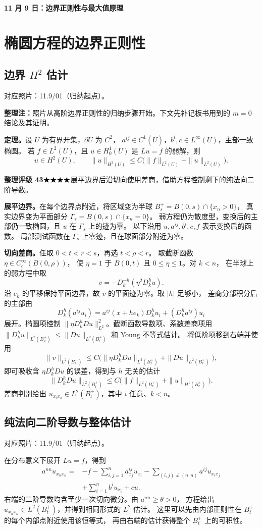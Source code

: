 \documentclass[UTF8,a4paper,11pt,fontset=fandol]{ctexart}
\newcommand{\Ub}{\overline U}
\newcommand{\ednote}[1]{\par{\small\color{notegray}\textbf{整理注：}#1}\par}
\newcommand{\source}[1]{{\small\color{notegray}对应照片：#1。}\par}
\newcommand{\proofstars}[1]{\ensuremath{%
\ifnum#1>0\relax\bigstar\fi
\ifnum#1>1\relax\bigstar\fi
\ifnum#1>2\relax\bigstar\fi
\ifnum#1>3\relax\bigstar\fi
\ifnum#1>4\relax\bigstar\fi}}
\newcommand{\proofrating}[3]{\par{\small\color{proofblue}%
\textbf{整理评级 #1}\enspace\proofstars{#2}\quad #3\par}}
\begin{document}
\newpage
{}
\begin{center}
  {\Large\bfseries 11 月 9 日：边界正则性与最大值原理}
\end{center}
\section{椭圆方程的边界正则性}
\subsection{\texorpdfstring{边界 $H^2$ 估计}{边界二阶估计}}
\source{11.9/01（归纳起点）}
\ednote{照片从高阶边界正则性的归纳步骤开始。下文先补记板书用到的 $m=0$ 结论及其证明。}
\textbf{定理。}设 $U$ 为有界开集，$\partial U$ 为 $C^2$，
$a^{ij}\in C^1(\Ub)$，$b^i,c\in L^\infty(U)$，主部一致椭圆。
若 $f\in L^2(U)$，且 $u\in H_0^1(U)$ 是 $Lu=f$ 的弱解，则
\[
\boxed{u\in H^2(U),\qquad
\|u\|_{H^2(U)}\le C\bigl(\|f\|_{L^2(U)}+\|u\|_{L^2(U)}\bigr).}
\]

\proofrating{43}{4}{展平边界后沿切向使用差商，借助方程控制剩下的纯法向二阶导数。}
\textbf{展平边界。}在每个边界点附近，将区域变为半球 $B_s^+=B(0,s)\cap\{x_n>0\}$，
真实边界变为平面部分 $\Gamma_s=B(0,s)\cap\{x_n=0\}$。
弱方程仍为散度型，变换后的主部仍一致椭圆，且 $u$ 在 $\Gamma_s$ 上的迹为零。
以下沿用 $u,a^{ij},b^i,c,f$ 表示变换后的函数。
局部测试函数在 $\Gamma_s$ 上零迹，且在球面部分附近为零。

\textbf{切向差商。}任取 $0<t<r<s$，再选 $t<\rho<r$。
取截断函数 $\eta\in C_c^\infty(B(0,\rho))$，
使 $\eta=1$ 于 $B(0,t)$ 且 $0\le\eta\le1$。对 $k<n$，
在半球上的弱方程中取
\[
v=-D_k^{-h}(\eta^2D_k^hu).
\]
沿 $e_k$ 的平移保持平面边界，故 $v$ 的平面迹为零。取 $|h|$ 足够小，
差商分部积分后的主部由
\[
D_k^h(a^{ij}u_i)
=a^{ij}(x+he_k)D_k^hu_i+(D_k^ha^{ij})u_i
\]
展开。椭圆项控制 $\|\eta D_k^h Du\|_{L^2}^2$。截断函数导数项、系数差商项用
$\|D_k^h u\|_{L^2(B_\rho^+)}\le\|Du\|_{L^2(B_r^+)}$ 和 Young 不等式估计。
将低阶项移到右端并使用
\[
\|v\|_{L^2(B_r^+)}\le
C\bigl(\|\eta D_k^h Du\|_{L^2(B_r^+)}+\|Du\|_{L^2(B_r^+)}\bigr),
\]
即可吸收含 $\eta D_k^h Du$ 的误差，得到与 $h$ 无关的估计
\[
\|D_k^h Du\|_{L^2(B_t^+)}
\le C\bigl(\|f\|_{L^2(B_r^+)}+\|u\|_{H^1(B_r^+)}\bigr).
\]
差商判别给出 $u_{x_ix_k}\in L^2(B_t^+)$，其中 $i$ 任意、$k<n$。

\newpage
\subsection{纯法向二阶导数与整体估计}
\source{11.9/01（归纳起点）}
在分布意义下展开 $Lu=f$，得到
\[
\begin{aligned}
a^{nn}u_{x_nx_n}
={}&-f-\sum_{i,j=1}^n a^{ij}_{x_j}u_{x_i}
 -\sum_{(i,j)\ne(n,n)}a^{ij}u_{x_ix_j}\\
&+\sum_{i=1}^n b^iu_{x_i}+cu.
\end{aligned}
\]
右端的二阶导数均含至少一次切向微分。由 $a^{nn}\ge\theta>0$，
方程给出 $u_{x_nx_n}\in L^2(B_t^+)$，并得到相同形式的 $L^2$ 估计。
这里可以先由内部正则性在 $B_t^+$ 的每个内部点附近使用该恒等式，
再由右端的估计获得整个 $B_t^+$ 上的可积性。
\end{document}
